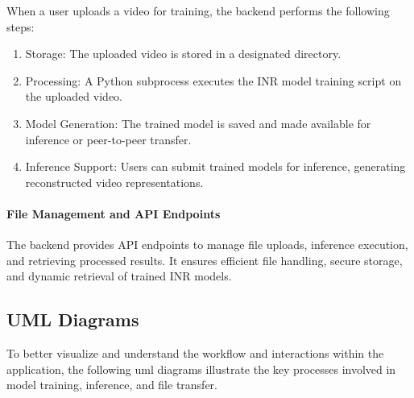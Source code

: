 When a user uploads a video for training, the backend performs the following steps:

\begin{enumerate}
    \item Storage: The uploaded video is stored in a designated directory.
    \item Processing: A Python subprocess executes the INR model training script on the uploaded video.
    \item Model Generation: The trained model is saved and made available for inference or peer-to-peer transfer.
    \item Inference Support: Users can submit trained models for inference, generating reconstructed video representations.
\end{enumerate}

\paragraph{File Management and API Endpoints}

The backend provides API endpoints to manage file uploads, inference execution, and retrieving processed results. It ensures efficient file handling, secure storage, and dynamic retrieval of trained INR models.

\pagebreak
\subsection{UML Diagrams}
To better visualize and understand the workflow and interactions within the application, the following \gls{uml} diagrams illustrate the key processes involved in model training, inference, and file transfer.
